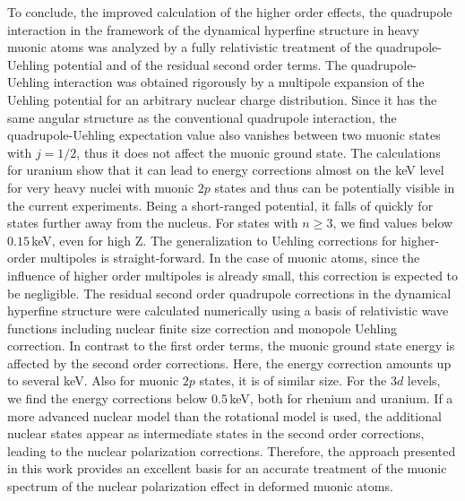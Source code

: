To conclude, the improved calculation of the higher order effects, the quadrupole interaction in the framework of the dynamical hyperfine structure in heavy muonic atoms was analyzed by a fully relativistic treatment of the quadrupole-Uehling potential and of the residual second order terms.
The quadrupole-Uehling interaction was obtained rigorously by a multipole expansion of the Uehling potential for an arbitrary nuclear charge distribution.
Since it has the same angular structure as the conventional quadrupole interaction, the quadrupole-Uehling expectation value also vanishes between two muonic states with $j=1/2$, thus it does not affect the muonic ground state.
The calculations for uranium show that it can lead to energy corrections almost on the keV level for very heavy nuclei with muonic $2p$ states and thus can be potentially visible in the current experiments. Being a short-ranged potential, it falls of quickly for states further away from the nucleus. For states with $n\geq3$, we find values below $0.15\,$keV, even for high Z.
The generalization to Uehling corrections for higher-order multipoles is straight-forward. In the case of muonic atoms, since the influence of higher order multipoles is already small, this correction is expected to be negligible.
The residual second order quadrupole corrections in the dynamical hyperfine structure were calculated numerically using a basis of relativistic wave functions including nuclear finite size correction and monopole Uehling correction.
In contrast to the first order terms, the muonic ground state energy is affected by the second order corrections. Here, the energy correction amounts up to several keV. Also for muonic $2p$ states, it is of similar size. For the $3d$ levels, we find the energy corrections below $0.5\,$keV, both for rhenium and uranium.
If a more advanced nuclear model than the rotational model is used, the additional nuclear states appear as intermediate states in the second order corrections, leading to the nuclear polarization corrections. Therefore, the approach presented in this work provides an excellent basis for an accurate treatment of the muonic spectrum of the nuclear polarization effect in deformed muonic atoms.

